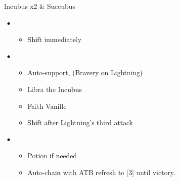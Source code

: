\begin{multicols}{2}
	\begin{battle}[0:28]{Incubus x2 \& Succubus}
		\begin{itemize}
			\item \fourth
			      \begin{itemize}
				      \item Shift immediately
			      \end{itemize}
			\item \second
			      \begin{itemize}
				      \item Auto-support, (Bravery on Lightning)
				      \item Libra the Incubus
				      \item Faith Vanille
				      \item Shift after Lightning's third attack
			      \end{itemize}
			\item \first
			      \begin{itemize}
				      \item Potion if needed
				      \item Auto-chain with ATB refresh to [3] until victory.
			      \end{itemize}
		\end{itemize}
		 
	\end{battle}
\end{multicols}
\renewcommand{\first}{[1] Relentless Assault (\rav/\com/\rav)}
\renewcommand{\second}{[2] Bully (\syn/\com/\sab)}
\renewcommand{\third}{[3] Relentless Assault (\rav/\com/\rav)}
\renewcommand{\fourth}{[4] Smart Bomb (\rav/\rav/\sab)}
\renewcommand{\fifth}{[5] Tri-Disaster (\rav/\rav/\rav)}
\renewcommand{\sixth}{[6] Malevolence (\syn/\rav/\rav)}

